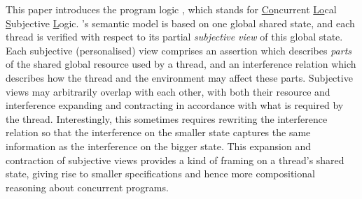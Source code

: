 


This paper introduces the program logic \colosl, which stands for 
\underline{Co}ncurrent \underline{Lo}cal \underline{S}ubjective
\underline{L}ogic. \colosl's semantic model is based on one global
shared state, and
each thread is verified with respect to its partial {\em subjective view}
of this global state. 
Each subjective (personalised) view comprises an assertion which
describes  \emph{parts} of the shared global resource used by a thread, 
and an interference relation which describes   how the thread and
the environment may affect these parts. 
Subjective views may arbitrarily overlap with
each other, with both their resource and interference expanding and
contracting  in accordance with what is required by the
thread. Interestingly, this
sometimes requires rewriting  the  interference relation so that 
the interference on the smaller state captures the same 
information as the interference on the bigger state. This expansion
and contraction of subjective views provides a kind of framing on a
thread's shared state, giving rise to smaller specifications and hence
more
compositional reasoning about concurrent programs. 



